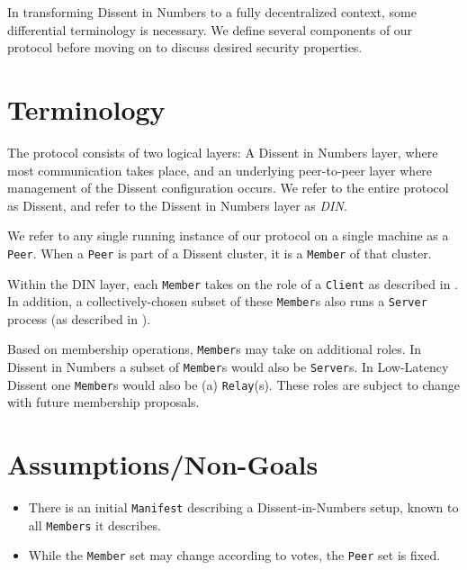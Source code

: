 In transforming Dissent in Numbers\cite{wolinsky_dissent_2012} to a fully
decentralized context, some differential terminology is necessary. We define
several components of our protocol before moving on to discuss desired security
properties.

\section{Terminology}
The protocol consists of two logical layers: A Dissent in Numbers layer, where
most communication takes place, and an underlying peer-to-peer layer where
management of the Dissent configuration occurs. We refer to the entire protocol
as Dissent, and refer to the Dissent in Numbers layer as \textit{DIN}.

We refer to any single running instance of our protocol on a single machine as a
\texttt{Peer}. When a \texttt{Peer} is part of a Dissent cluster, it is a
\texttt{Member} of that cluster.

Within the DIN layer, each \texttt{Member} takes on the role of a
\texttt{Client} as described in \cite{wolinsky_dissent_2012}. In addition, a
collectively-chosen subset of these \texttt{Member}s also runs a \texttt{Server}
process (as described in \cite{wolinsky_dissent_2012}).

Based on membership operations, \texttt{Member}s may take on additional roles.
In Dissent in Numbers a subset of \texttt{Member}s would also be
\texttt{Server}s. In Low-Latency Dissent one \texttt{Member}s would
also be (a) \texttt{Relay}(s). These roles are subject to change with future
membership proposals.

\section{Assumptions/Non-Goals}
\begin{itemize}
  \item There is an initial \texttt{Manifest} describing a Dissent-in-Numbers
    setup, known to all \texttt{Members} it describes.
  \item While the \texttt{Member} set may change according to votes, the
    \texttt{Peer} set is fixed.
\end{itemize}

